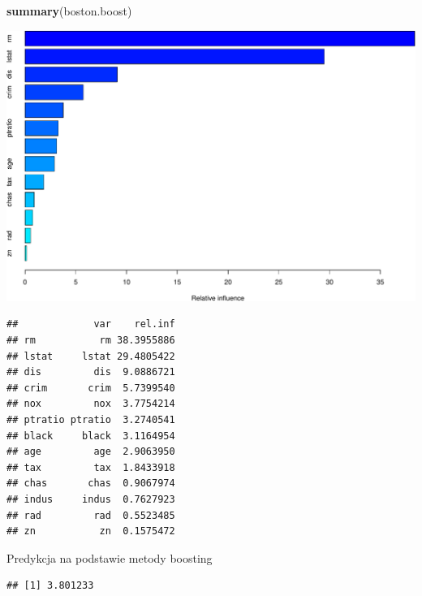 \documentclass[
]{book}
\newenvironment{Shaded}{\begin{snugshade}}{\end{snugshade}}
\newcommand{\DataTypeTok}[1]{\textcolor[rgb]{0.13,0.29,0.53}{#1}}
\newcommand{\DecValTok}[1]{\textcolor[rgb]{0.00,0.00,0.81}{#1}}
\newcommand{\KeywordTok}[1]{\textcolor[rgb]{0.13,0.29,0.53}{\textbf{#1}}}
\newcommand{\NormalTok}[1]{#1}
\newcommand{\OperatorTok}[1]{\textcolor[rgb]{0.81,0.36,0.00}{\textbf{#1}}}
\newcommand{\StringTok}[1]{\textcolor[rgb]{0.31,0.60,0.02}{#1}}
\theoremstyle{plain}
\theoremstyle{definition}
\theoremstyle{definition}
\theoremstyle{definition}
\theoremstyle{definition}
\theoremstyle{remark}
\begin{document}
\begin{Shaded}
\begin{Highlighting}[]
\KeywordTok{summary}\NormalTok{(boston.boost)}
\end{Highlighting}
\end{Shaded}

\includegraphics{EksploracjaDanych_files/figure-latex/unnamed-chunk-43-1.pdf}

\begin{verbatim}
##             var    rel.inf
## rm           rm 38.3955886
## lstat     lstat 29.4805422
## dis         dis  9.0886721
## crim       crim  5.7399540
## nox         nox  3.7754214
## ptratio ptratio  3.2740541
## black     black  3.1164954
## age         age  2.9063950
## tax         tax  1.8433918
## chas       chas  0.9067974
## indus     indus  0.7627923
## rad         rad  0.5523485
## zn           zn  0.1575472
\end{verbatim}

Predykcja na podstawie metody boosting

\begin{Shaded}
\end{Shaded}

\begin{verbatim}
## [1] 3.801233
\end{verbatim}
\end{document}
